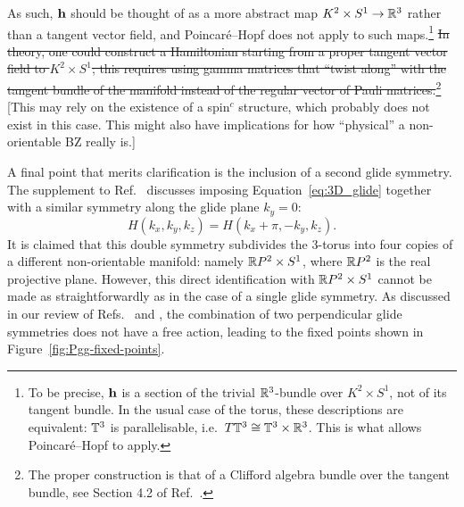 As such, $\vb{h}$ should be thought of as a more abstract map $K^2\times S^1\to\mathbb{R}^3$ rather than a tangent vector field, and Poincaré--Hopf does not apply to such maps.\footnote{
	To be precise, $\vb{h}$ is a section of the trivial $\mathbb{R}^3$-bundle over $K^2\times S^1$, not of its tangent bundle. In the usual case of the torus, these descriptions are equivalent: $\mathbb{T}^3$ is parallelisable, i.e.\ $T\mathbb{T}^3\cong \mathbb{T}^3\times\mathbb{R}^3$. This is what allows Poincaré--Hopf to apply.}
{\color{red}
\st{In theory, one could construct a Hamiltonian starting from a proper tangent vector field to $K^2\times S^1$; this requires using gamma matrices that ``twist along'' with the tangent bundle of the manifold instead of the regular vector of Pauli matrices.}\footnote{\color{red}
	The proper construction is that of a Clifford algebra bundle over the tangent bundle, see Section 4.2 of Ref.~\cite{Mathai_math-review}.}
[This may rely on the existence of a spin$^c$ structure, which probably does not exist in this case. This might also have implications for how ``physical'' a non-orientable BZ really is.]
}

A final point that merits clarification is the inclusion of a second glide symmetry. The supplement to Ref.~\cite{Fonseca-Vaidya_nonorientable} discusses imposing Equation~\eqref{eq:3D_glide} together with a similar symmetry along the glide plane $k_y = 0$:
\begin{equation}
	H(k_x, k_y, k_z) = H(k_x + \pi, -k_y, k_z).
\end{equation}
It is claimed that this double symmetry subdivides the 3-torus into four copies of a different non-orientable manifold: namely $\mathbb{R} P^2\times S^1$, where $\mathbb{R} P^2$ is the real projective plane. However, this direct identification with $\mathbb{R} P^2\times S^1$ cannot be made as straightforwardly as in the case of a single glide symmetry. As discussed in our review of Refs.~\cite{HZY_RP2} and \cite{WangZhang_acoustic-Klein-2D}, the combination of two perpendicular glide symmetries does not have a free action, leading to the fixed points shown in Figure~\ref{fig:Pgg-fixed-points}.

